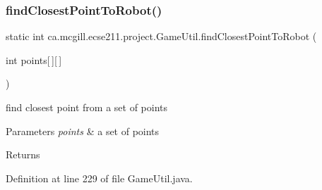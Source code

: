 \subsubsection{\texorpdfstring{find\+Closest\+Point\+To\+Robot()}{findClosestPointToRobot()}}
{\footnotesize\ttfamily static int ca.\+mcgill.\+ecse211.\+project.\+Game\+Util.\+find\+Closest\+Point\+To\+Robot (\begin{DoxyParamCaption}\item[{int}]{points\mbox{[}$\,$\mbox{]}\mbox{[}$\,$\mbox{]} }\end{DoxyParamCaption})\hspace{0.3cm}{\ttfamily [static]}}

find closest point from a set of points


\begin{DoxyParams}{Parameters}
{\em points} & a set of points \\
\hline
\end{DoxyParams}
\begin{DoxyReturn}{Returns}

\end{DoxyReturn}


Definition at line 229 of file Game\+Util.\+java.


